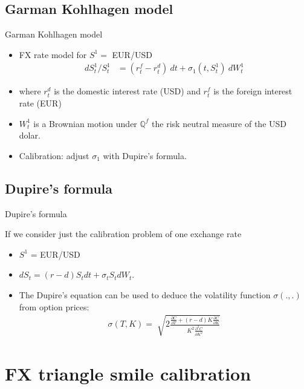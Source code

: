 \documentclass[10pt]{beamer} %
\begin{document}
        \subsection{Garman Kohlhagen model}
        \begin{frame}[t]{Garman Kohlhagen model}
    	\begin{itemize}
    	\item<+-> FX rate model for $S^1 = $ EUR/USD
        \begin{align*}
        d S_t^1/S_t^1 &= (r_t^f - r_t^d) \:dt + \sigma_1(t,S_t^1)\:dW_t^1
        \end{align*}
        \item<+-> where $r_t^d$ is the domestic interest rate (USD) and $r_t^f$ is the foreign interest rate (EUR)
        \item<+-> $W_t^{1}$ is a Brownian motion under $\mathbb{Q}^f$ the risk neutral measure of the USD dolar.
        \item<+-> Calibration: adjust $\sigma_1$ with Dupire's formula.
    	\end{itemize}
    \end{frame}
    
    \subsection{Dupire's formula}
    
    \begin{frame}[t]{Dupire's formula}
    
    If we consider just the calibration problem  of one exchange rate
    	\begin{itemize}
    		\item<+-> $S^1$ = EUR/USD
    		\item<+-> $dS_t = (r - d)S_tdt + \sigma_tS_tdW_t$. 
            \item<+-> The Dupire's equation can be used to deduce the volatility function $\sigma(.,.)$ from option prices:     \begin{align*}
    			\sigma(T,K) = \sqrt[]{2\frac{\frac{\partial C}{\partial T}+(r - d)K\frac{\partial C}{\partial K}}{K^2\frac{\partial^2C}{\partial K^2}}}
    		\end{align*}
    	\end{itemize}
    \end{frame}
    
    \section{FX triangle smile calibration}
    
\end{document}
